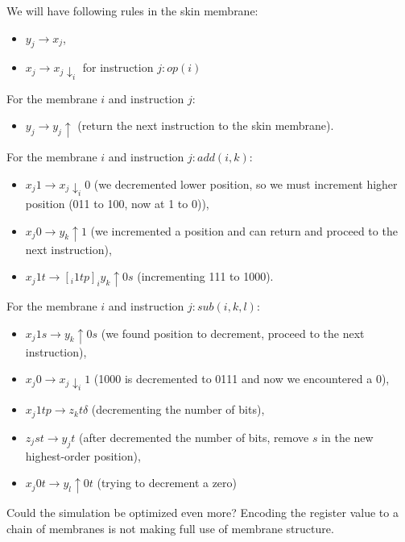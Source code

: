 \documentclass[llncs,submission,copyright,creativecommons]{../lib/lncs/llncs}
\begin{document}
We will have following rules in the skin membrane:
\begin{itemize}
  \item $y_j \rightarrow x_j$,
  \item $x_j \rightarrow x_j\downarrow_{i}$ for instruction $j: op(i)$
\end{itemize}

For the membrane $i$ and instruction $j$:
\begin{itemize}
  \item $y_j \rightarrow y_j \uparrow$ (return the next instruction to the skin membrane).
\end{itemize}

For the membrane $i$ and instruction $j: add(i,k)$:
\begin{itemize}
  \item $x_j1 \rightarrow x_j\downarrow_{i}0$ (we decremented lower position, so we must increment higher position (011 to 100, now at 1 to 0)),
  \item $x_j0 \rightarrow y_k \uparrow 1$ (we incremented a position and can return and proceed to the next instruction),
  \item $x_j1t \rightarrow [_i 1tp]_iy_k\uparrow 0s$ (incrementing 111 to 1000).
\end{itemize}

For the membrane $i$ and instruction $j: sub(i,k,l)$:
\begin{itemize}
  \item $x_j1s \rightarrow y_k \uparrow 0s$ (we found position to decrement, proceed to the next instruction),
  \item $x_j0 \rightarrow x_j\downarrow_i 1$ (1000 is decremented to 0111 and now we encountered a 0),
  \item $x_j1tp \rightarrow z_kt \delta$ (decrementing the number of bits),
  \item $z_jst \rightarrow y_jt$ (after decremented the number of bits, remove $s$ in the new highest-order position),
  \item $x_j0t \rightarrow y_l \uparrow 0t$ (trying to decrement a zero)
\end{itemize}

Could the simulation be optimized even more? Encoding the register value to a chain of membranes is not making full use of membrane structure.


\end{document}
